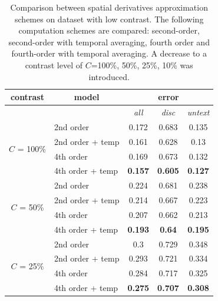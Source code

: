 \begin{table}[ht] \scriptsize
  \centering
  \caption{Comparison between spatial derivatives approximation schemes on  \rub dataset with low contrast. The following computation schemes are compared:  second-order, second-order with temporal averaging, fourth order and fourth-order with temporal averaging. A decrease to a contrast level of $C$=100\%, 50\%, 25\%, 10\% was introduced.}
    \begin{tabular}{ccccc}
    \toprule
    \multicolumn{1}{c}{contrast} & \multicolumn{1}{c}{model} & \multicolumn{3}{c}{error} \\
    \midrule
          &       & \multicolumn{1}{c}{\textit{all}} & \multicolumn{1}{c}{\textit{disc}} & \multicolumn{1}{c}{\textit{untext}} \\
          \midrule
          \midrule
    \multicolumn{1}{c}{\multirow{4}[0]{*}{$C$ = 100\%}} & \multicolumn{1}{l}{2nd order} & 0.172 & 0.683 & 0.135 \\
    \multicolumn{1}{c}{} & \multicolumn{1}{l}{2nd order + temp} & 0.161 & 0.628 & 0.13 \\
    \multicolumn{1}{c}{} & \multicolumn{1}{l}{4th order} & 0.169 & 0.673 & 0.132 \\
    \multicolumn{1}{c}{} & \multicolumn{1}{l}{4th order + temp} & \textbf{0.157} & \textbf{0.605} & \textbf{0.127} \\
     \midrule
    \multicolumn{1}{c}{\multirow{4}[0]{*}{$C$ = 50\%}} & \multicolumn{1}{l}{2nd order} & 0.224 & 0.681 & 0.238 \\
    \multicolumn{1}{c}{} & \multicolumn{1}{l}{2nd order + temp} & 0.214 & 0.667 & 0.223 \\
    \multicolumn{1}{c}{} & \multicolumn{1}{l}{4th order} & 0.207 & 0.662 & 0.213 \\
    \multicolumn{1}{c}{} & \multicolumn{1}{l}{4th order + temp} & \textbf{0.193} & \textbf{0.64} & \textbf{0.195} \\
     \midrule
    \multicolumn{1}{c}{\multirow{4}[0]{*}{$C$ = 25\%}} & \multicolumn{1}{l}{2nd order} & 0.3   & 0.729 & 0.348 \\
    \multicolumn{1}{c}{} & \multicolumn{1}{l}{2nd order + temp} & 0.293 & 0.721 & 0.334 \\
    \multicolumn{1}{c}{} & \multicolumn{1}{l}{4th order} & 0.284 & 0.717 & 0.325 \\
    \multicolumn{1}{c}{} & \multicolumn{1}{l}{4th order + temp} & \textbf{0.275} & \textbf{0.707} & \textbf{0.308} \\

\end{tabular}
\end{table}
